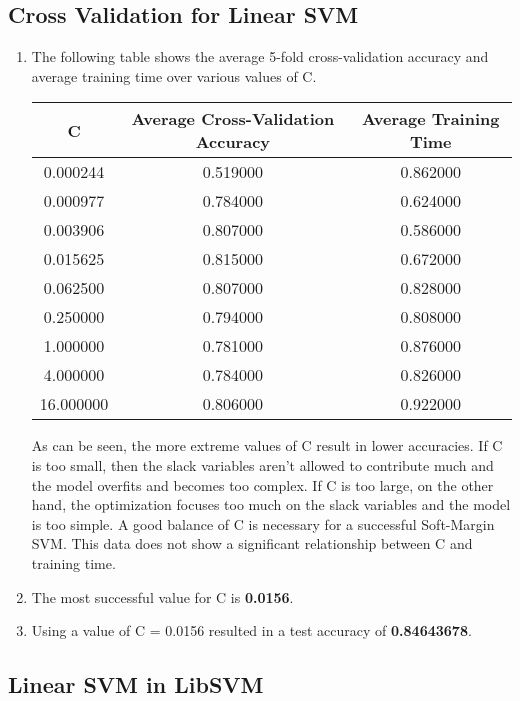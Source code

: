 \documentclass[12pt]{article}
\begin{document}
\subsection{Cross Validation for Linear SVM}
\begin{enumerate}[label=\alph*.]
	\item The following table shows the average 5-fold cross-validation accuracy and average training time over various values of C. 
	\begin{center}
	\begin{tabular}{| c | c | c |} 
		\hline
	    	C & Average Cross-Validation Accuracy & Average Training Time \\
		\hline \hline
		0.000244 & 0.519000 & 0.862000 \\
		\hline
		0.000977 & 0.784000 & 0.624000 \\
		\hline
		0.003906 & 0.807000 & 0.586000 \\
		\hline
		0.015625 & 0.815000 & 0.672000 \\
		\hline
		0.062500 & 0.807000 & 0.828000 \\
		\hline
		0.250000 & 0.794000 & 0.808000 \\
		\hline
		1.000000 & 0.781000 & 0.876000 \\
		\hline
		4.000000 & 0.784000 & 0.826000 \\
		\hline
		16.000000 & 0.806000 & 0.922000 \\
		\hline
	    \end{tabular}
	\end{center}
	As can be seen, the more extreme values of C result in lower accuracies. If C is too small, then the slack variables aren't allowed to contribute much and the model overfits and becomes too complex. If C is too large, on the other hand, the optimization focuses too much on the slack variables and the model is too simple. A good balance of C is necessary for a successful Soft-Margin SVM. This data does not show a significant relationship between C and training time.
	\item The most successful value for C is \textbf{0.0156}.
	\item Using a value of C = 0.0156 resulted in a test accuracy of \textbf{0.84643678}.
\end{enumerate}

\subsection{Linear SVM in LibSVM}
\end{document}
